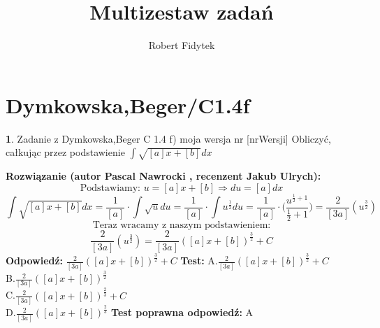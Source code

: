 \documentclass[12pt, a4paper]{article}
\title{Multizestaw zadań}
\author{Robert Fidytek}
\date{}
\theoremstyle{definition} %
\newtheorem{zad}{}
\newcommand{\kategoria}[1]{\section{#1}} %
\newcommand{\zadStart}[1]{\begin{zad}#1\newline} %
\newcommand{\zadStop}{\end{zad}}   %
\newcommand{\rozwStart}[2]{\noindent \textbf{Rozwiązanie (autor #1 , recenzent #2): }\newline} %
\newcommand{\odpStart}{\noindent \textbf{Odpowiedź:}\newline}    %
\newcommand{\odpStop}{\newline}                                             %
\newcommand{\testStart}{\noindent \textbf{Test:}\newline} %
\newcommand{\testStop}{\newline} %
\newcommand{\kluczStart}{\noindent \textbf{Test poprawna odpowiedź:}\newline} %
\newcommand{\kluczStop}{\newline} %
\begin{document}
\maketitle



\kategoria{Dymkowska,Beger/C1.4f}
\zadStart{Zadanie z Dymkowska,Beger C 1.4 f) moja wersja nr [nrWersji]}
Obliczyć, całkując przez podstawienie $\displaystyle \int \sqrt{[a]x+[b]}dx$
\zadStop
\rozwStart{Pascal Nawrocki}{Jakub Ulrych}
$$\text{Podstawiamy: } u=[a]x+[b]\Rightarrow du=[a]dx$$
$$\displaystyle \int \sqrt{[a]x+[b]}dx=\displaystyle \frac{1}{[a]}\cdot\int \sqrt{u}du=\displaystyle \frac{1}{[a]}\cdot\int u^{\frac{1}{2}}du=\frac{1}{[a]}\cdot\bigg(\frac{u^{\frac{1}{2}+1}}{\frac{1}{2}+1}\bigg)= \frac{2}{[3a]}(u^{\frac{3}{2}})$$
$$\text{Teraz wracamy z naszym podstawieniem:}$$
$$ \frac{2}{[3a]}(u^{\frac{3}{2}})= \frac{2}{[3a]}([a]x+[b])^{\frac{3}{2}}+C$$
\odpStart
$\frac{2}{[3a]}([a]x+[b])^{\frac{3}{2}}+C$
\odpStop
\testStart
A.$ \frac{2}{[3a]}([a]x+[b])^{\frac{3}{2}}+C$
\\
B.$ \frac{2}{[3a]}([a]x+[b])^{\frac{3}{2}}$
\\
C.$ \frac{2}{[3a]}([a]x+[b])^{\frac{2}{3}}+C$
\\
D.$ \frac{2}{[3a]}([a]x+[b])^{\frac{2}{3}}$
\testStop
\kluczStart
A
\kluczStop
\end{document}
